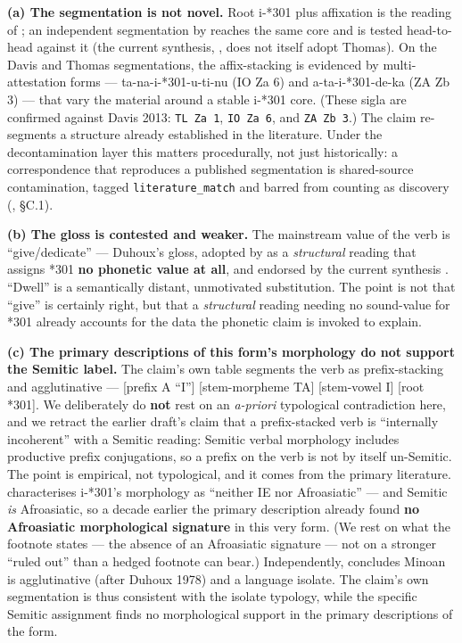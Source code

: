 \textbf{(a) The segmentation is not novel.} Root i-*301 plus affixation is
the reading of \citet{davis2013}; an independent segmentation by
\citet{thomas2020} reaches the same core and is tested head-to-head against
it (the current synthesis, \citealp{salgarella2025}, does not itself adopt
Thomas). On the Davis and Thomas segmentations, the affix-stacking is
evidenced by multi-attestation forms --- ta-na-i-*301-u-ti-nu (IO Za 6) and
a-ta-i-*301-de-ka (ZA Zb 3) --- that vary the material around a stable
i-*301 core. (These sigla are confirmed against Davis 2013: \texttt{TL Za
1}, \texttt{IO Za 6}, and \texttt{ZA Zb 3}.) The claim re-segments a
structure already established in the literature. Under the decontamination
layer this matters procedurally, not just historically: a correspondence
that reproduces a published segmentation is shared-source contamination,
tagged \texttt{literature\_match} and barred from counting as discovery
(\artref, \S C.1).

\textbf{(b) The gloss is contested and weaker.} The mainstream value of the
verb is ``give/dedicate'' --- Duhoux's \citeyearpar{duhoux1992} gloss,
adopted by \citet{davis2013} as a \emph{structural} reading that assigns
*301 \textbf{no phonetic value at all}, and endorsed by the current
synthesis \citep[\S7.2]{salgarella2025}. ``Dwell'' is a semantically
distant, unmotivated substitution. The point is not that ``give'' is
certainly right, but that a \emph{structural} reading needing no
sound-value for *301 already accounts for the data the phonetic claim is
invoked to explain.

\textbf{(c) The primary descriptions of this form's morphology do not
support the Semitic label.} The claim's own table segments the verb as
prefix-stacking and agglutinative --- [prefix A ``I''] [stem-morpheme TA]
[stem-vowel I] [root *301]. We deliberately do \textbf{not} rest on an
\emph{a-priori} typological contradiction here, and we retract the earlier
draft's claim that a prefix-stacked verb is ``internally incoherent'' with
a Semitic reading: Semitic verbal morphology includes productive prefix
conjugations, so a prefix on the verb is not by itself un-Semitic. The
point is empirical, not typological, and it comes from the primary
literature. \citet[p.~38 n.~13]{davis2013} characterises i-*301's
morphology as ``neither IE nor Afroasiatic'' --- and Semitic \emph{is}
Afroasiatic, so a decade earlier the primary description already found
\textbf{no Afroasiatic morphological signature} in this very form. (We rest
on what the footnote states --- the absence of an Afroasiatic signature ---
not on a stronger ``ruled out'' than a hedged footnote can bear.)
Independently, \citet[\S8]{salgarella2025} concludes Minoan is
agglutinative (after Duhoux 1978) and a language isolate. The claim's own
segmentation is thus consistent with the isolate typology, while the
specific Semitic assignment finds no morphological support in the primary
descriptions of the form.

